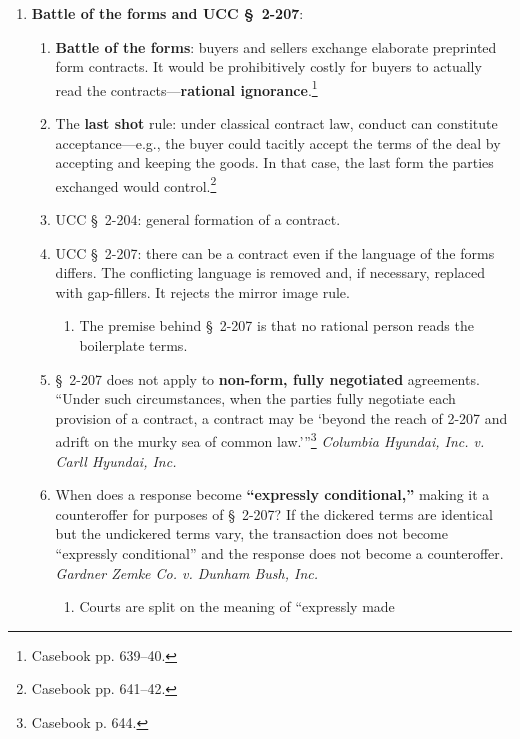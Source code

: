 \begin{enumerate}
    \item \textbf{Battle of the forms and UCC \S\ 2-207}:
    \begin{enumerate}
        \item \textbf{Battle of the forms}: buyers and sellers exchange 
        elaborate preprinted form contracts. It would be prohibitively costly 
        for buyers to actually read the contracts---\textbf{rational 
        ignorance}.\footnote{Casebook pp. 639--40.}
        \item  The \textbf{last shot} rule: under classical contract law, 
        conduct can constitute acceptance---e.g., the buyer could tacitly 
        accept the terms of the deal by accepting and keeping the goods. In 
        that case, the last form the parties exchanged would 
        control.\footnote{Casebook pp.  641--42.}
        \item UCC \S\ 2-204: general formation of a contract.
        \item UCC \S\ 2-207: there can be a contract even if the language of 
        the forms differs. The conflicting language is removed and, if 
        necessary, replaced with gap-fillers. It rejects the mirror image 
        rule.
        \begin{enumerate}
            \item The premise behind \S\ 2-207 is that no rational person 
            reads the boilerplate terms.
        \end{enumerate}
        \item \S\ 2-207 does not apply to \textbf{non-form, fully negotiated} 
        agreements. \enquote{Under such circumstances, when the parties fully 
        negotiate each provision of a contract, a contract may be 
        \enquote{beyond the reach of 2-207 and adrift on the murky sea of 
        common law.}}\footnote{Casebook p. 644.} \emph{Columbia Hyundai, Inc. 
        v. Carll Hyundai, Inc.}
        \item When does a response become \textbf{``expressly conditional,''} 
        making it a counteroffer for purposes of \S\ 2-207? If the dickered 
        terms are identical but the undickered terms vary, the transaction 
        does not become ``expressly conditional'' and the response does not 
        become a counteroffer. \emph{Gardner Zemke Co. v. Dunham Bush, Inc.}
        \begin{enumerate}
            \item Courts are split on the meaning of ``expressly made 

\end{enumerate}
\end{enumerate}
\end{enumerate}
